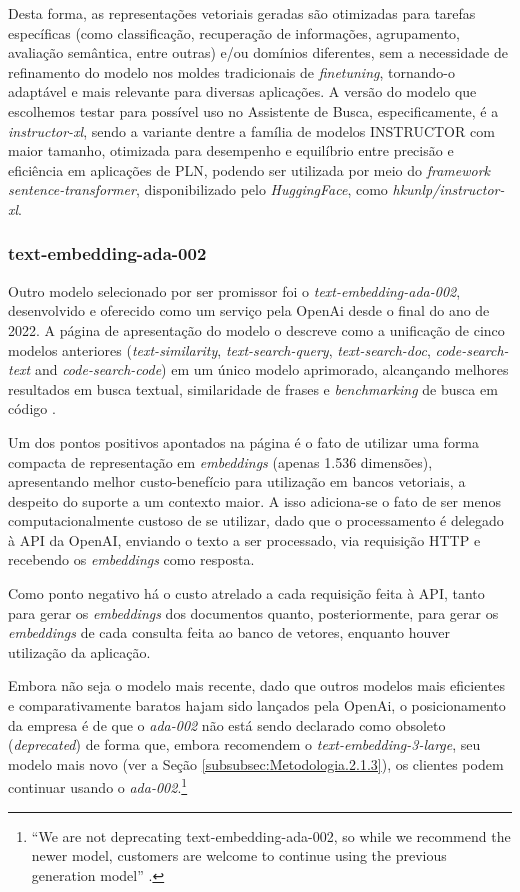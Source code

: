 Desta forma, as representações vetoriais geradas são otimizadas para tarefas específicas (como classificação, recuperação de informações, agrupamento, avaliação semântica, entre outras) e/ou domínios diferentes, sem a necessidade de refinamento do modelo nos moldes tradicionais de \textit{finetuning}, tornando-o adaptável e mais relevante para diversas aplicações.
A versão do modelo que escolhemos testar para possível uso no Assistente de Busca, especificamente, é a \textit{instructor-xl}, sendo a variante dentre a família de modelos INSTRUCTOR com maior tamanho, otimizada para desempenho e equilíbrio entre precisão e eficiência em aplicações de \ac{PLN}, podendo ser utilizada por meio do \textit{framework} \textit{sentence-transformer}, disponibilizado pelo \textit{HuggingFace}, como \textit{hkunlp/instructor-xl}.

\subsubsection{text-embedding-ada-002}
\label{subsubsec:Metodologia.2.1.2}

Outro modelo selecionado por ser promissor foi o \textit{text-embedding-ada-002}, desenvolvido e oferecido como um serviço pela OpenAi desde o final do ano de 2022. A página de apresentação do modelo o descreve como a unificação de cinco modelos anteriores (\textit{text-similarity}, \textit{text-search-query}, \textit{text-search-doc}, \textit{code-search-text} and \textit{code-search-code}) em um único modelo aprimorado, alcançando melhores resultados em busca textual, similaridade de frases e \textit{benchmarking} de busca em código \cite{ADA:1}.

Um dos pontos positivos apontados na página é o fato de utilizar uma forma compacta de representação em \textit{embeddings} (apenas 1.536 dimensões), apresentando melhor custo-benefício para utilização em bancos vetoriais, a despeito do suporte a um contexto maior. A isso adiciona-se o fato de ser menos computacionalmente custoso de se utilizar, dado que o processamento é delegado à API da OpenAI, enviando o texto a ser processado, via requisição HTTP e recebendo os \textit{embeddings} como resposta.

Como ponto negativo há o custo atrelado a cada requisição feita à API, tanto para gerar os \textit{embeddings} dos documentos quanto, posteriormente, para gerar os \textit{embeddings} de cada consulta feita ao banco de vetores, enquanto houver utilização da aplicação.

Embora não seja o modelo mais recente, dado que outros modelos mais eficientes e comparativamente baratos hajam sido lançados pela OpenAi, o posicionamento da empresa é de que o \textit{ada-002} não está sendo declarado como obsoleto (\textit{deprecated}) de forma que, embora recomendem o \textit{text-embedding-3-large}, seu modelo mais novo (ver a Seção \ref{subsubsec:Metodologia.2.1.3}), os clientes podem continuar usando o \textit{ada-002}.\footnote{``We are not deprecating text-embedding-ada-002, so while we recommend the newer model, customers are welcome to continue using the previous generation model'' \cite{3_large:1}.}

